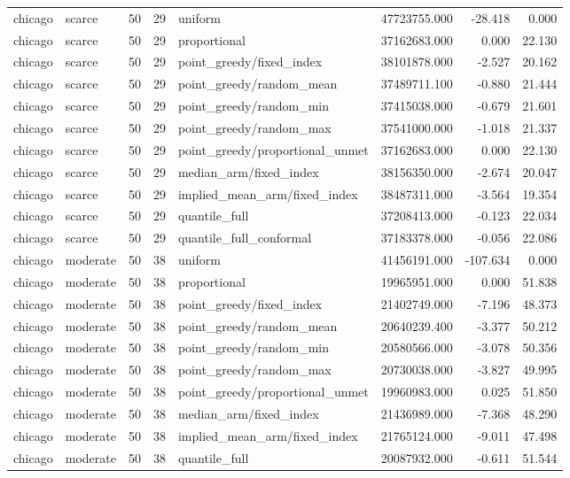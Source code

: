 \begin{tabular}{llrrlrrr}
chicago & scarce & 50 & 29 & uniform & 47723755.000 & -28.418 & 0.000 \\
chicago & scarce & 50 & 29 & proportional & 37162683.000 & 0.000 & 22.130 \\
chicago & scarce & 50 & 29 & point\_greedy/fixed\_index & 38101878.000 & -2.527 & 20.162 \\
chicago & scarce & 50 & 29 & point\_greedy/random\_mean & 37489711.100 & -0.880 & 21.444 \\
chicago & scarce & 50 & 29 & point\_greedy/random\_min & 37415038.000 & -0.679 & 21.601 \\
chicago & scarce & 50 & 29 & point\_greedy/random\_max & 37541000.000 & -1.018 & 21.337 \\
chicago & scarce & 50 & 29 & point\_greedy/proportional\_unmet & 37162683.000 & 0.000 & 22.130 \\
chicago & scarce & 50 & 29 & median\_arm/fixed\_index & 38156350.000 & -2.674 & 20.047 \\
chicago & scarce & 50 & 29 & implied\_mean\_arm/fixed\_index & 38487311.000 & -3.564 & 19.354 \\
chicago & scarce & 50 & 29 & quantile\_full & 37208413.000 & -0.123 & 22.034 \\
chicago & scarce & 50 & 29 & quantile\_full\_conformal & 37183378.000 & -0.056 & 22.086 \\
chicago & moderate & 50 & 38 & uniform & 41456191.000 & -107.634 & 0.000 \\
chicago & moderate & 50 & 38 & proportional & 19965951.000 & 0.000 & 51.838 \\
chicago & moderate & 50 & 38 & point\_greedy/fixed\_index & 21402749.000 & -7.196 & 48.373 \\
chicago & moderate & 50 & 38 & point\_greedy/random\_mean & 20640239.400 & -3.377 & 50.212 \\
chicago & moderate & 50 & 38 & point\_greedy/random\_min & 20580566.000 & -3.078 & 50.356 \\
chicago & moderate & 50 & 38 & point\_greedy/random\_max & 20730038.000 & -3.827 & 49.995 \\
chicago & moderate & 50 & 38 & point\_greedy/proportional\_unmet & 19960983.000 & 0.025 & 51.850 \\
chicago & moderate & 50 & 38 & median\_arm/fixed\_index & 21436989.000 & -7.368 & 48.290 \\
chicago & moderate & 50 & 38 & implied\_mean\_arm/fixed\_index & 21765124.000 & -9.011 & 47.498 \\
chicago & moderate & 50 & 38 & quantile\_full & 20087932.000 & -0.611 & 51.544 \\

\end{tabular}
